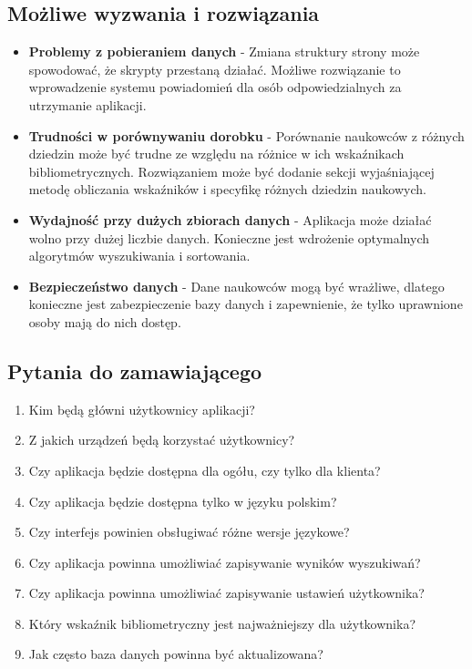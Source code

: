 \documentclass{article}
\begin{document}
\subsection{Możliwe wyzwania i rozwiązania}
\begin{itemize}
  \item \textbf{Problemy z pobieraniem danych} - Zmiana struktury strony może spowodować, że skrypty przestaną działać. Możliwe rozwiązanie to wprowadzenie systemu powiadomień dla osób odpowiedzialnych za utrzymanie aplikacji.
  \item \textbf{Trudności w porównywaniu dorobku} - Porównanie naukowców z różnych dziedzin może być trudne ze względu na różnice w ich wskaźnikach bibliometrycznych. Rozwiązaniem może być dodanie sekcji wyjaśniającej metodę obliczania wskaźników i specyfikę różnych dziedzin naukowych.
  \item \textbf{Wydajność przy dużych zbiorach danych} - Aplikacja może działać wolno przy dużej liczbie danych. Konieczne jest wdrożenie optymalnych algorytmów wyszukiwania i sortowania.
  \item \textbf{Bezpieczeństwo danych} - Dane naukowców mogą być wrażliwe, dlatego konieczne jest zabezpieczenie bazy danych i zapewnienie, że tylko uprawnione osoby mają do nich dostęp.
\end{itemize}

\subsection{Pytania do zamawiającego}
\begin{enumerate}
  \item Kim będą główni użytkownicy aplikacji?
  \item Z jakich urządzeń będą korzystać użytkownicy?
  \item Czy aplikacja będzie dostępna dla ogółu, czy tylko dla klienta?
  \item Czy aplikacja będzie dostępna tylko w języku polskim?
  \item Czy interfejs powinien obsługiwać różne wersje językowe?
  \item Czy aplikacja powinna umożliwiać zapisywanie wyników wyszukiwań?
  \item Czy aplikacja powinna umożliwiać zapisywanie ustawień użytkownika?
  \item Który wskaźnik bibliometryczny jest najważniejszy dla użytkownika?
  \item Jak często baza danych powinna być aktualizowana?
\end{enumerate}
\newpage
\end{document}
